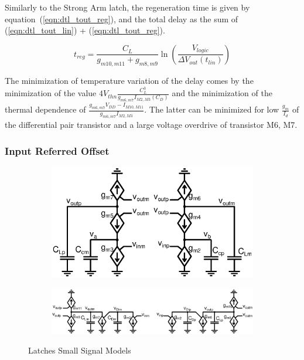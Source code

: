 Similarly to the Strong Arm latch, the regeneration time is given by equation~(\ref{eqn:dtl_tout_reg}), and the total delay as the sum of (\ref{eqn:dtl_tout_lin}) + (\ref{eqn:dtl_tout_reg}).

\begin{equation}
\label{eqn:dtl_tout_reg}
t_{reg} = \frac{C_{L}}{g_{m10,m11}+g_{m8,m9}} \ln{\left(\frac{V_{logic}}{\Delta V_{out}(t_{lin})}\right)}
\end{equation}

The minimization of temperature variation of the delay comes by the minimization of the value \(4V_{thn}\frac{C_L^3}{g_{m6,m7}I_{M2,M3}(C_{D})}\) and the minimization of the thermal dependence of \(\frac{g_{m6,m7}V_{DD}-I_{M10,M11}}{g_{m6,m7}I_{M2,M3}}\). The latter can be minimized for low \(\frac{g_m}{I_d}\) of the differential pair transistor and a large voltage overdrive of transistor M6, M7.

\subsubsection{Input Referred Offset}
\begin{figure}[htp]
    \centering
    \begin{subfigure}[b]{0.44\textwidth}
        \centering
        \includegraphics[width=\textwidth]{Chapter7/Figs/sa_small_signal_model.ps}
        \label{fig:sa_small_signal}
    \end{subfigure}
    \begin{subfigure}[b]{0.54\textwidth}
        \centering
        \includegraphics[width=\textwidth]{Chapter7/Figs/dtl_small_signal_model.ps}
        \label{fig:dt_small_signal}
    \end{subfigure}
    \caption{Latches Small Signal Models}
    \label{fig:latches_small_signal}
\end{figure}


